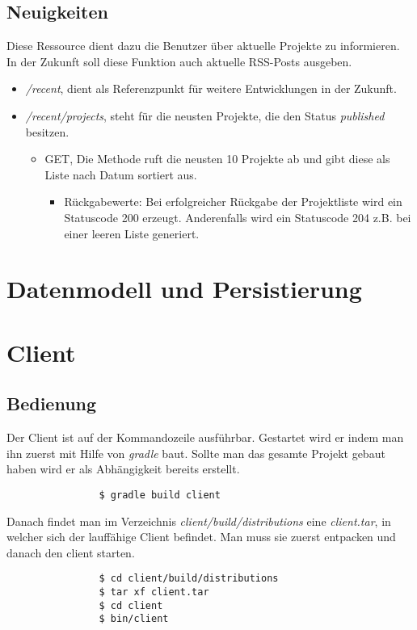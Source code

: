 \documentclass[12pt]{scrartcl}
\begin{document}
\subsection{Neuigkeiten}
Diese Ressource dient dazu die Benutzer über aktuelle Projekte zu informieren. In der Zukunft soll diese Funktion auch aktuelle RSS-Posts ausgeben.
\begin{itemize}
	\item\emph{/recent}, dient als Referenzpunkt für weitere Entwicklungen in der Zukunft.
	\item\emph{/recent/projects}, steht für die neusten Projekte, die den Status \emph{published} besitzen.
	\begin{itemize}
		\item GET, Die Methode ruft die neusten 10 Projekte ab und gibt diese als Liste nach Datum sortiert aus.
		\begin{itemize}
			\item Rückgabewerte: Bei erfolgreicher Rückgabe der Projektliste wird ein Statuscode 200 erzeugt. Anderenfalls wird ein Statuscode 204 z.B. bei einer leeren Liste generiert.
		\end{itemize}
	\end{itemize} 
\end{itemize}
	\section{Datenmodell und Persistierung}
	\section{Client}
	\label{sec:client}
		\subsection{Bedienung}
		
			Der Client ist auf der Kommandozeile ausführbar. Gestartet wird er indem man ihn zuerst mit Hilfe von \emph{gradle} baut. Sollte man das gesamte Projekt gebaut haben wird er als Abhängigkeit bereits erstellt.
			\begin{verbatim}
				$ gradle build client
			\end{verbatim}
			
			Danach findet man im Verzeichnis \emph{client/build/distributions} eine \emph{client.tar}, in welcher sich der lauffähige Client befindet. Man muss sie zuerst entpacken und danach den client starten.
			
			\begin{verbatim}
				$ cd client/build/distributions
				$ tar xf client.tar
				$ cd client
				$ bin/client
			\end{verbatim}
			
\end{document}
